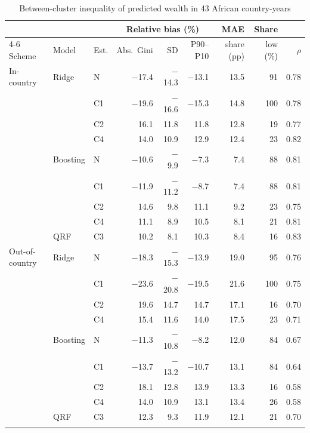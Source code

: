 \begin{table}[ht]
\caption{Between-cluster inequality of predicted wealth in 43 African country-years}\label{tab:sat}%
\setlength{\tabcolsep}{4pt}%
\begin{tabular*}{\textwidth}{@{\extracolsep\fill}lllrrrrrr@{}}
\toprule
 & & & \multicolumn{3}{c}{Relative bias (\%)} & MAE & Share & \\
\cmidrule{4-6}
Scheme & Model & Est. & Abs.\ Gini & SD & P90--P10 & share (pp) & low (\%) & $\rho$\\
\midrule
In-country & Ridge & N & $-$17.4 & $-$14.3 & $-$13.1 & 13.5 & 91 & 0.78 \\
 &  & C1 & $-$19.6 & $-$16.6 & $-$15.3 & 14.8 & 100 & 0.78 \\
 &  & C2 & 16.1 & 11.8 & 11.8 & 12.8 & 19 & 0.77 \\
 &  & C4 & 14.0 & 10.9 & 12.9 & 12.4 & 23 & 0.82 \\
 & Boosting & N & $-$10.6 & $-$9.9 & $-$7.3 & 7.4 & 88 & 0.81 \\
 &  & C1 & $-$11.9 & $-$11.2 & $-$8.7 & 7.4 & 88 & 0.81 \\
 &  & C2 & 14.6 & 9.8 & 11.1 & 9.2 & 23 & 0.75 \\
 &  & C4 & 11.1 & 8.9 & 10.5 & 8.1 & 21 & 0.81 \\
 & QRF & C3 & 10.2 & 8.1 & 10.3 & 8.4 & 16 & 0.83 \\
\midrule
Out-of-country & Ridge & N & $-$18.3 & $-$15.3 & $-$13.9 & 19.0 & 95 & 0.76 \\
 &  & C1 & $-$23.6 & $-$20.8 & $-$19.5 & 21.6 & 100 & 0.75 \\
 &  & C2 & 19.6 & 14.7 & 14.7 & 17.1 & 16 & 0.70 \\
 &  & C4 & 15.4 & 11.6 & 14.0 & 17.5 & 23 & 0.71 \\
 & Boosting & N & $-$11.3 & $-$10.8 & $-$8.2 & 12.0 & 84 & 0.67 \\
 &  & C1 & $-$13.7 & $-$13.2 & $-$10.7 & 13.1 & 84 & 0.64 \\
 &  & C2 & 18.1 & 12.8 & 13.9 & 13.3 & 16 & 0.58 \\
 &  & C4 & 14.0 & 10.9 & 13.1 & 13.4 & 26 & 0.58 \\
 & QRF & C3 & 12.3 & 9.3 & 11.9 & 12.1 & 21 & 0.70 \\
\botrule
\end{tabular*}
\end{table}

